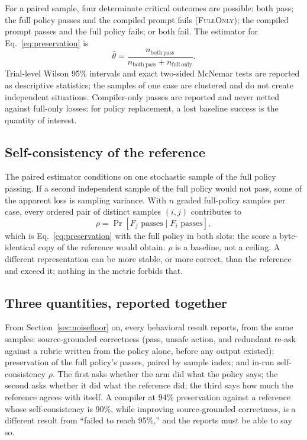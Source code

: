 \documentclass[11pt]{article}
\newcommand{\fullonly}{\textsc{FullOnly}}
\begin{document}
For a paired sample, four determinate critical outcomes are possible: both pass; the full policy passes and the compiled prompt fails (\fullonly); the compiled prompt passes and the full policy fails; or both fail. The estimator for Eq.~\ref{eq:preservation} is
\begin{equation}
  \widehat{\theta} = \frac{n_{\mathrm{both\ pass}}}{n_{\mathrm{both\ pass}} + n_{\mathrm{full\ only}}}.
\end{equation}
Trial-level Wilson 95\% intervals and exact two-sided McNemar tests are reported as descriptive statistics; the samples of one case are clustered and do not create independent situations. Compiler-only passes are reported and never netted against full-only losses: for policy replacement, a lost baseline success is the quantity of interest.

\subsection{Self-consistency of the reference}
\label{sec:selfconsistency}

The paired estimator conditions on one stochastic sample of the full policy passing. If a second independent sample of the full policy would not pass, some of the apparent loss is sampling variance. With $n$ graded full-policy samples per case, every ordered pair of distinct samples $(i,j)$ contributes to
\begin{equation}
  \rho = \Pr\!\left[F_j \text{ passes} \mid F_i \text{ passes}\right],
  \label{eq:rho}
\end{equation}
which is Eq.~\ref{eq:preservation} with the full policy in both slots: the score a byte-identical copy of the reference would obtain. $\rho$ is a baseline, not a ceiling. A different representation can be more stable, or more correct, than the reference and exceed it; nothing in the metric forbids that.

\subsection{Three quantities, reported together}

From Section~\ref{sec:noisefloor} on, every behavioral result reports, from the same samples: source-grounded correctness (pass, unsafe action, and redundant re-ask against a rubric written from the policy alone, before any output existed); preservation of the full policy's passes, paired by sample index; and in-run self-consistency $\rho$. The first asks whether the arm did what the policy says; the second asks whether it did what the reference did; the third says how much the reference agrees with itself. A compiler at 94\% preservation against a reference whose self-consistency is 90\%, while improving source-grounded correctness, is a different result from ``failed to reach 95\%,'' and the reports must be able to say so.
\end{document}
